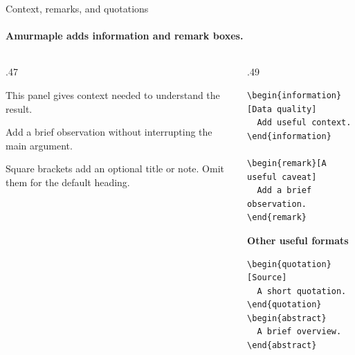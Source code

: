 \begin{frame}[fragile]{Context, remarks, and quotations}
  \framesubtitle{Amurmaple adds information and remark boxes.}
  \small
  \begin{columns}[T,onlytextwidth]
    \begin{column}{.47\textwidth}
      \begin{information}
        This panel gives context needed to understand the result.
      \end{information}
      \begin{remark}
        Add a brief observation without interrupting the main argument.
      \end{remark}
      \smallskip
      Square brackets add an optional title or note. Omit them for the
      default heading.
    \end{column}
    \begin{column}{.49\textwidth}
      {\footnotesize
\begin{verbatim}
\begin{information}[Data quality]
  Add useful context.
\end{information}

\begin{remark}[A useful caveat]
  Add a brief observation.
\end{remark}
\end{verbatim}
      }
      \smallskip
      \textbf{Other useful formats}\par
      {\footnotesize
\begin{verbatim}
\begin{quotation}[Source]
  A short quotation.
\end{quotation}
\begin{abstract}
  A brief overview.
\end{abstract}
\end{verbatim}
      }
    \end{column}
  \end{columns}
\end{frame}

